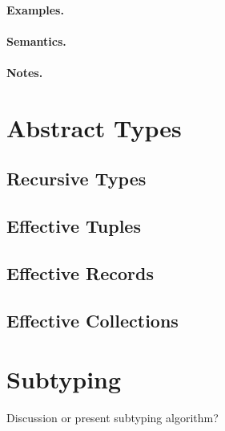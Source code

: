 \paragraph{Examples.}

\paragraph{Semantics.}

\paragraph{Notes.}

\section{Abstract Types}
\subsection{Recursive Types}
\subsection{Effective Tuples}
\subsection{Effective Records}
\subsection{Effective Collections}

\section{Subtyping}
Discussion or present subtyping algorithm?
